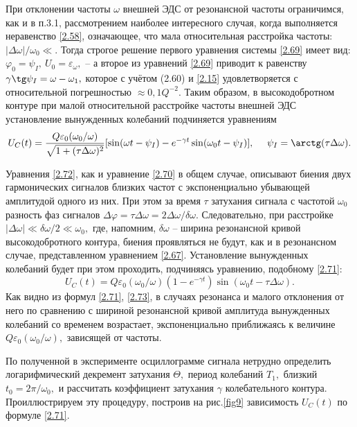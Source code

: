 {При отклонении частоты $\omega$ внешней ЭДС от резонансной частоты   ограничимся, как и в п.3.1, рассмотрением наиболее интересного случая, когда выполняется неравенство \eqref{2.58}, означающее, что мала относительная расстройка частоты: $|\Delta\omega|/\omega_0\ll.$ Тогда строгое решение первого уравнения системы \eqref{2.69} имеет вид: $\varphi_0=\psi_I,~U_0=\varepsilon_{\omega},$ – а второе из уравнений \eqref{2.69} приводит к равенству $\gamma\tg\psi_I=\omega-\omega_1,$ которое с учётом (2.60) и \eqref{2.15} удовлетворяется с от\-носительной погрешностью $\approx0,1Q^{-2}.$ Таким образом, в высокодобротном контуре при малой относительной расстройке частоты внешней ЭДС установление вынужденных колебаний под\-чиняется уравнениям
\begin{equation}\label{2.72}
U_C(t)=\dfrac{Q\varepsilon_0(\omega_0/\omega)}{\sqrt{1+(\tau\Delta\omega)^2}}[\sin(\omega t-\psi_I)-e^{-\gamma t}\sin(\omega_0t-\psi_I)],~~~~\psi_I=\arctg(\tau\Delta\omega).
\end{equation}

Уравнения \eqref{2.72}, как и уравнение \eqref{2.70} в общем случае, описывают биения двух гармони\-ческих сигналов близких частот с экспоненциально убывающей амплитудой одного из них. При этом за время $\tau$ затухания сигнала с частотой $\omega_0$ разность фаз сигналов $\Delta\varphi=\tau\Delta\omega=2\Delta\omega/\delta\omega.$ Следовательно, при расстройке $|\Delta\omega|\ll\delta\omega/2\ll\omega_0,$ где, напомним, $\delta\omega$ – ширина резонансной кривой высокодобротного контура, биения проявляться не будут, как и в резонансном случае, представленном уравнением \eqref{2.67}. Установление вынужденных колебаний будет при этом проходить, подчиняясь уравнению, подобному \eqref{2.71}:
\begin{equation}\label{2.73}
U_C(t)=Q\varepsilon_0(\omega_0/\omega)\left(1-e^{-\gamma t}\right)\sin(\omega_0t-\tau\Delta\omega).
\end{equation}
Как видно из формул \eqref{2.71}, \eqref{2.73}, в случаях резонанса и малого отклонения от него по сравне\-нию с шириной резонансной кривой амплитуда вынужденных колебаний со временем возрастает, экспоненциально приближаясь к величине $Q\varepsilon_0(\omega_0/\omega),$ зависящей от частоты. 

По полученной в эксперименте осциллограмме сигнала нетрудно определить логарифмический декремент затухания $\Theta,$ период колебаний $T_1,$ близкий $t_0=2\pi/\omega_0,$ и рассчитать коэффициент затухания $\gamma$ колебательного контура. Проиллюстрируем эту процедуру, построив на рис.\ref{fig9} зависимость $U_C(t)$ по формуле \eqref{2.71}.

}
